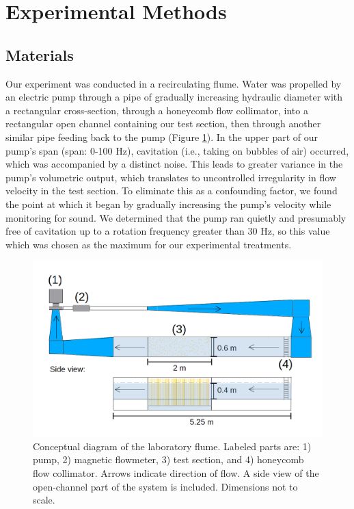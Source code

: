 \documentclass{scrreprt}
\begin{document}
\section{Experimental Methods}

\subsection{Materials}

Our experiment was conducted in a recirculating flume. Water was propelled by an electric pump through a pipe of gradually increasing hydraulic diameter with a rectangular cross-section, through a honeycomb flow collimator, into a rectangular open channel containing our test section, then through another similar pipe feeding back to the pump (Figure \ref{fig:floorplan}). In the upper part of our pump's span (span: 0-100 Hz), cavitation (i.e., taking on bubbles of air) occurred, which was accompanied by a distinct noise. This leads to greater variance in the pump's volumetric output, which translates to uncontrolled irregularity in flow velocity in the test section. To eliminate this as a confounding factor, we found the point at which it began by gradually increasing the pump's velocity while monitoring for sound. We determined that the pump ran quietly and presumably free of cavitation up to a rotation frequency greater than 30 Hz, so this value which was chosen as the maximum for our experimental treatments.

\begin{figure}[htbp]
\includegraphics[width=15cm]{flume.png}
\centering
\caption{Conceptual diagram of the laboratory flume. Labeled parts are: 1) pump, 2) magnetic flowmeter, 3) test section, and 4) honeycomb flow collimator. Arrows indicate direction of flow. A side view of the open-channel part of the system is included. Dimensions not to scale.}
\label{fig:floorplan}
\end{figure}
\end{document}
